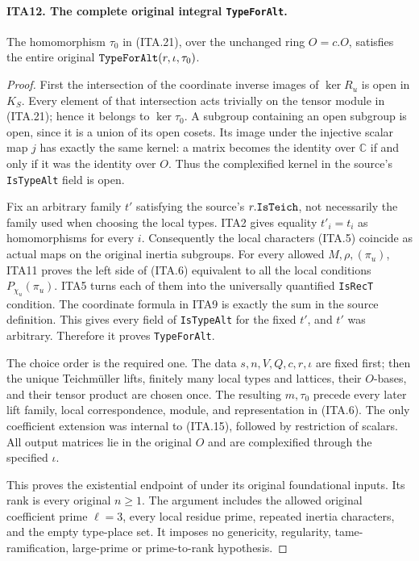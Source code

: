 \documentclass[11pt,a4paper]{article}
\numberwithin{equation}{section}
\theoremstyle{remark}\newtheorem{remark}[theorem]{Remark}
\begin{document}
\paragraph{ITA12. The complete original integral \texttt{Type\allowbreak For\allowbreak Alt}.}
\label{claim:ITA12}
The homomorphism $\tau_0$ in (ITA.21), over the unchanged
ring $O=c.O$, satisfies the entire original
$\texttt{Type\allowbreak For\allowbreak Alt}(r,\iota,\tau_0)$.
\begin{proof}
First the intersection of the coordinate inverse images
of $\ker R_u$ is open in $K_S$.  Every element of that
intersection acts trivially on the tensor module in
(ITA.21); hence it belongs to $\ker\tau_0$.
A subgroup containing an open subgroup is open, since
it is a union of its open cosets.  Its image under the
injective scalar map $j$ has exactly the same kernel:
a matrix becomes the identity over $\mathbb C$ if and
only if it was the identity over $O$.  Thus the
complexified kernel in the source's \texttt{Is\allowbreak Type\allowbreak Alt}
field is open.

Fix an arbitrary family $t'$ satisfying the source's
$r.\texttt{Is\allowbreak Teich}$, not necessarily the family used
when choosing the local types.  ITA2 gives equality
$t'_i=t_i$ as homomorphisms for every $i$.  Consequently
the local characters (ITA.5) coincide as actual maps
on the original inertia subgroups.  For every allowed
$M,\rho,(\pi_u)$, ITA11 proves the left side of
(ITA.6) equivalent to all the local conditions
$P_{\chi_u}(\pi_u)$.  ITA5 turns each of them into
the universally quantified \texttt{Is\allowbreak Rec\allowbreak T} condition.
The coordinate formula in ITA9 is exactly the sum in
the source definition.  This gives every field of
\texttt{Is\allowbreak Type\allowbreak Alt} for the fixed $t'$, and $t'$ was
arbitrary.  Therefore it proves \texttt{Type\allowbreak For\allowbreak Alt}.

The choice order is the required one.  The data
$s,n,V,Q,c,r,\iota$ are fixed first; then the unique
Teichm\"uller lifts, finitely many local types and
lattices, their $O$-bases, and their tensor product
are chosen once.  The resulting $m,\tau_0$ precede
every later lift family, local correspondence, module,
and representation in (ITA.6).  The only coefficient
extension was internal to (ITA.15), followed by
restriction of scalars.  All output matrices lie in
the original $O$ and are complexified through the
specified $\iota$.

This proves the existential endpoint of
under its original foundational inputs.  Its rank is
every original $n\geq1$.  The argument includes the
allowed original coefficient prime $\ell=3$, every
local residue prime, repeated inertia characters,
and the empty type-place set.  It imposes no
genericity, regularity, tame-ramification, large-prime
or prime-to-rank hypothesis.
\end{proof}
\end{document}
